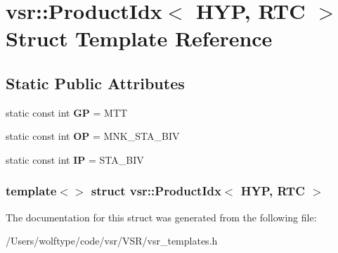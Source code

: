 \hypertarget{structvsr_1_1_product_idx_3_01_h_y_p_00_01_r_t_c_01_4}{\section{vsr\-:\-:Product\-Idx$<$ H\-Y\-P, R\-T\-C $>$ Struct Template Reference}
\label{structvsr_1_1_product_idx_3_01_h_y_p_00_01_r_t_c_01_4}
}
\subsection*{Static Public Attributes}
\begin{DoxyCompactItemize}
\item 
\hypertarget{structvsr_1_1_product_idx_3_01_h_y_p_00_01_r_t_c_01_4_ae75c8a626912a1f0bc415c5d937cce67}{static const int {\bfseries G\-P} = M\-T\-T}\label{structvsr_1_1_product_idx_3_01_h_y_p_00_01_r_t_c_01_4_ae75c8a626912a1f0bc415c5d937cce67}

\item 
\hypertarget{structvsr_1_1_product_idx_3_01_h_y_p_00_01_r_t_c_01_4_add036ac9b35a8cb8bae1352f01b05255}{static const int {\bfseries O\-P} = M\-N\-K\-\_\-\-S\-T\-A\-\_\-\-B\-I\-V}\label{structvsr_1_1_product_idx_3_01_h_y_p_00_01_r_t_c_01_4_add036ac9b35a8cb8bae1352f01b05255}

\item 
\hypertarget{structvsr_1_1_product_idx_3_01_h_y_p_00_01_r_t_c_01_4_aa76c60501c6cb70da0db1e0d0c927297}{static const int {\bfseries I\-P} = S\-T\-A\-\_\-\-B\-I\-V}\label{structvsr_1_1_product_idx_3_01_h_y_p_00_01_r_t_c_01_4_aa76c60501c6cb70da0db1e0d0c927297}

\end{DoxyCompactItemize}
\subsubsection*{template$<$$>$ struct vsr\-::\-Product\-Idx$<$ H\-Y\-P, R\-T\-C $>$}



The documentation for this struct was generated from the following file\-:\begin{DoxyCompactItemize}
\item 
/\-Users/wolftype/code/vsr/\-V\-S\-R/vsr\-\_\-templates.\-h\end{DoxyCompactItemize}
